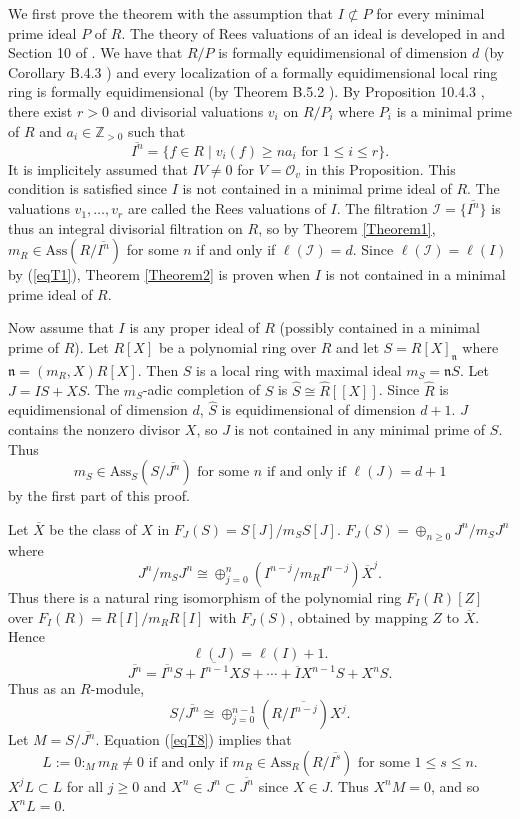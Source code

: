 \documentclass[11pt]{amsart}
\def\NZQ{\mathbb}               %
\def\ZZ{{\NZQ Z}}
\theoremstyle{definition}
\begin{document}
We first prove the theorem with the assumption that $I\not\subset P$ for every minimal prime ideal $P$ of $R$. 
The theory of Rees valuations of an ideal is developed in \cite{R} and Section 10 of \cite{HS}.
We have that $R/P$ is formally equidimensional of dimension $d$ (by Corollary B.4.3 \cite{HS}) and every localization of a formally equidimensional local ring ring is formally equidimensional (by Theorem B.5.2 \cite{HS}).  By Proposition 10.4.3 \cite{HS}, there exist $r>0$ and divisorial valuations $v_i$ on $R/P_i$ where $P_i$ is a minimal prime of $R$ and $a_i\in \ZZ_{>0}$ such that 
$$
\overline{I^n}=\{f\in R\mid v_i(f)\ge na_i\mbox{ for }1\le i\le r\}.
$$
It is implicitely assumed that $IV\ne 0$ for  $V=\mathcal O_v$ in this Proposition. 
This condition is satisfied since $I$ is not contained in a minimal prime ideal of $R$. The valuations $v_1,\ldots,v_r$ are called the Rees valuations of $I$.
The filtration $\mathcal I=\{\overline{I^n}\}$ is thus an integral divisorial filtration on $R$, so by Theorem \ref{Theorem1}, $m_R\in \mbox{Ass}(R/\overline{I^n})$ for some $n$ if and only if $\ell(\mathcal I)=d$. Since $\ell(\mathcal I)=\ell(I)$ by (\ref{eqT1}), Theorem \ref{Theorem2} is proven when $I$ is not contained in a minimal prime ideal of $R$.

Now assume that $I$ is any proper ideal of $R$ (possibly contained in a minimal prime of $R$). Let $R[X]$ be a polynomial ring over $R$ and let $S=R[X]_{\mathfrak n}$ where $\mathfrak n=(m_R,X)R[X]$. Then $S$ is a local ring with maximal ideal $m_S=\mathfrak n S$. Let $J=IS+XS$. The $m_S$-adic completion of $S$ is $\hat S\cong \hat R[[X]]$. Since $\hat R$ is equidimensional of dimension $d$, $\hat S$ is equidimensional of dimension $d+1$. $J$ contains the nonzero divisor $X$, so $J$ is not contained in any minimal prime of $S$. Thus 
\begin{equation}\label{eqT5}
m_S\in \mbox{Ass}_S(S/\overline{J^n})\mbox{ for some $n$ if and only if }\ell(J)=d+1
\end{equation}
by the first part of this proof. 

Let $\overline X$ be the class of $X$ in $F_J(S)=S[J]/m_SS[J]$.
$F_J(S)=\oplus_{n\ge 0}J^n/m_SJ^n$ where
$$
J^n/m_SJ^n\cong \oplus_{j=0}^n\left(I^{n-j}/m_RI^{n-j}\right)\overline X^j.
$$
Thus there is a natural ring isomorphism of the polynomial ring $F_I(R)[Z]$ over $F_I(R)=R[I]/m_RR[I]$ with $F_J(S)$, obtained by mapping $Z$ to $\overline X$. Hence
\begin{equation}\label{eqT6}
\ell(J)=\ell(I)+1.
\end{equation}
$$
\overline{J^n}=\overline{I^n}S+\overline{I^{n-1}}XS+\cdots+\overline IX^{n-1}S+X^nS.
$$
Thus as an $R$-module,
\begin{equation}\label{eqT8}
S/\overline{J^n}\cong \oplus_{j=0}^{n-1}(R/\overline{I^{n-j}})X^j.
\end{equation}
Let $M=S/\overline{J^n}$. Equation (\ref{eqT8}) implies that
\begin{equation}\label{eqT10}
L:=0:_M m_R\ne 0 \mbox{ if and only if }m_R\in \mbox{Ass}_R(R/\overline{I^s})\mbox{ for some }1\le s\le n.
\end{equation}
$X^jL\subset L$ for all $j\ge 0$ and $X^n\in J^n\subset \overline{J^n}$ since $X\in J$. Thus $X^nM=0$, and so $X^nL=0$.
\end{document}

